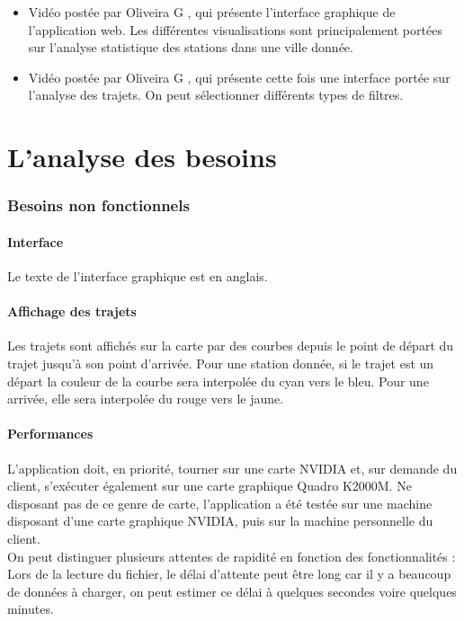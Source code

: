 \documentclass[12pt]{article}
\begin{document}
\begin{itemize}
			\item Vidéo postée par Oliveira G \cite{state_station}, qui présente l'interface
			graphique de l'application web. Les différentes visualisations sont principalement
			portées sur l'analyse statistique des stations dans une ville donnée.\\

			\item Vidéo postée par Oliveira G \cite{trips}, qui présente cette fois une
			interface portée sur l'analyse des trajets. On peut sélectionner différents types
			de filtres.\\

		\end{itemize}

\newpage
\part{L'analyse des besoins}
	\section{Besoins non fonctionnels}
		\subsection{Interface}
		Le texte de l’interface graphique est en anglais.

		\subsection{Affichage des trajets}
		Les trajets sont affichés sur la carte par des courbes depuis le point de départ du
		trajet jusqu’à son point d’arrivée. Pour une station donnée, si le trajet est un départ
		la couleur de la courbe sera interpolée du cyan vers le bleu. Pour une arrivée, elle sera
		interpolée du rouge vers le jaune.

		\subsection{Performances}
		L’application doit, en priorité, tourner sur une carte NVIDIA et,
		sur demande du client, s’exécuter également sur une carte graphique Quadro K2000M. Ne 
		disposant pas de ce genre de carte, l'application a été testée sur une machine 
		disposant d'une carte graphique NVIDIA, puis sur la machine personnelle du client. \\
		
		On peut distinguer plusieurs attentes de rapidité en fonction des fonctionnalités :
		Lors de la lecture du fichier, le délai d’attente peut être long car il y a
		beaucoup de données à charger, on peut estimer ce délai à quelques secondes voire
		quelques minutes. \\
		
\end{document}
